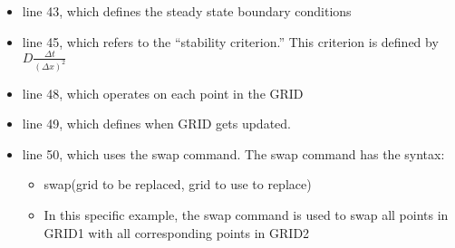 \documentclass{article}
\begin{document}
\begin{itemize} \itemsep1pt \parskip0pt 
\item line 43, which defines the steady state boundary conditions
\item line 45, which refers to the “stability criterion.” This criterion is defined by $D\frac{\Delta t}{(\Delta x)^2}$
\item line 48, which operates on each point in the GRID
\item line 49, which defines when GRID gets updated.
\item line 50, which uses the swap command. The swap command has the syntax:
\begin{itemize} \itemsep1pt \parskip0pt 
\item swap(grid to be replaced, grid to use to replace)
\item In this specific example, the swap command is used to swap all points in GRID1 with all corresponding points in GRID2
\end{itemize}
\end{itemize}
\end{document}
